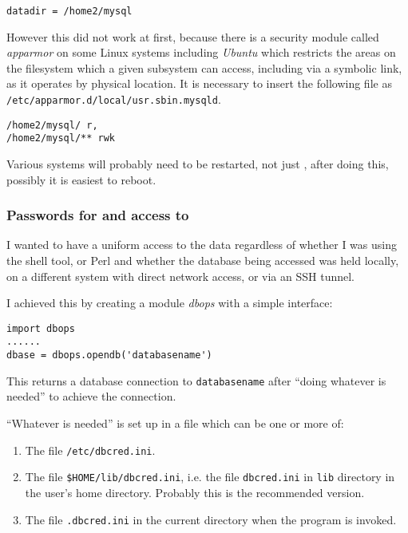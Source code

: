 \begin{verbatim}
datadir	= /home2/mysql
\end{verbatim}

However this did not work at first, because there is a security module called
\textit{apparmor} on some Linux systems including \textit{Ubuntu} which
restricts the areas on the filesystem which a given subsystem can access,
including via a symbolic link, as it operates by physical location. It is
necessary to insert the following file as \texttt{/etc/apparmor.d/local/usr.sbin.mysqld}.

\begin{verbatim}
/home2/mysql/ r,
/home2/mysql/** rwk
\end{verbatim}

Various systems will probably need to be restarted, not just \mysql, after
doing this, possibly it is easiest to reboot.

\subsubsection{Passwords for and access to \mysql}
\protect\label{section:mysqlpw}

I wanted to have a uniform access to the {\mysql} data regardless of whether I
was using the shell tool, {\py} or Perl and whether the database being accessed
was held locally, on a different system with direct network access, or via an
SSH tunnel.

I achieved this by creating a {\py} module \textit{dbops} with a simple
interface:

\begin{verbatim}
import dbops
......
dbase = dbops.opendb('databasename')
\end{verbatim}

This returns a database connection to \texttt{databasename} after ``doing
whatever is needed'' to achieve the connection.

``Whatever is needed'' is set up in a file which can be one or more of:

\begin{enumerate}
  \item The file \texttt{/etc/dbcred.ini}.
  \item The file \texttt{\$HOME/lib/dbcred.ini}, i.e. the file
  \texttt{dbcred.ini} in \texttt{lib} directory in the user's home directory.
  Probably this is the recommended version.
  \item The file \texttt{.dbcred.ini} in the current directory when the program
  is invoked.
\end{enumerate}


